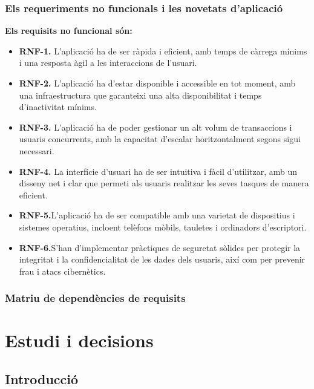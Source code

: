 \documentclass[a4paper,12pt,twoside]{ThesisStyle}
\begin{document}
\subsection{Els requeriments no funcionals i les novetats d'aplicació}
\label{subsec:Els requeriments no funcionals i les novetats d'aplicació}

\textbf{Els requisits no funcional són:}
\begin{itemize}
    \item \textbf{RNF-1.} L'aplicació ha de ser ràpida i eficient, amb temps de càrrega mínims i una resposta àgil a les interaccions de l'usuari.
    \item \textbf{RNF-2.} L'aplicació ha d'estar disponible i accessible en tot moment, amb una infraestructura que garanteixi una alta disponibilitat i temps d'inactivitat mínims.
    \item \textbf{RNF-3.} L'aplicació ha de poder gestionar un alt volum de transaccions i usuaris concurrents, amb la capacitat d'escalar horitzontalment segons sigui necessari.
    \item \textbf{RNF-4.} La interfície d'usuari ha de ser intuitiva i fàcil d'utilitzar, amb un disseny net i clar que permeti als usuaris realitzar les seves tasques de manera eficient.
    \item \textbf{RNF-5.}L'aplicació ha de ser compatible amb una varietat de dispositius i sistemes operatius, incloent telèfons mòbils, tauletes i ordinadors d'escriptori.
    \item \textbf{RNF-6.}S'han d'implementar pràctiques de seguretat sòlides per protegir la integritat i la confidencialitat de les dades dels usuaris, així com per prevenir frau i atacs cibernètics.
\end{itemize}


\subsection{Matriu de dependències de requisits}
\label{Matriu de dependències de requisits}



\chapter{Estudi i decisions}
\label{chp:estudi}


\section{Introducció}
\label{sec:Introducció}
\end{document}
